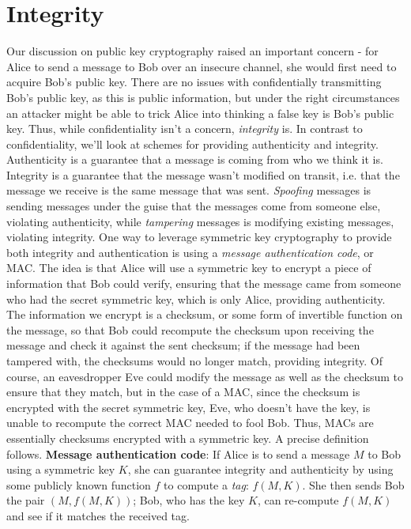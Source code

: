 \documentclass{article}
\begin{document}
\section{Integrity}
Our discussion on public key cryptography raised an important concern - for Alice to send a message to Bob over an insecure channel, she would first need to acquire Bob's public key. There are no issues with confidentially transmitting Bob's public key, as this is public information, but under the right circumstances an attacker might be able to trick Alice into thinking a false key is Bob's public key. Thus, while confidentiality isn't a concern, \textit{integrity} is.
\newline
In contrast to confidentiality, we'll look at schemes for providing authenticity and integrity. Authenticity is a guarantee that a message is coming from who we think it is. Integrity is a guarantee that the message wasn't modified on transit, i.e. that the message we receive is the same message that was sent. \textit{Spoofing} messages is sending messages under the guise that the messages come from someone else, violating authenticity, while \textit{tampering} messages is modifying existing messages, violating integrity.
\newline
One way to leverage symmetric key cryptography to provide both integrity and authentication is using a \textit{message authentication code}, or MAC. The idea is that Alice will use a symmetric key to encrypt a piece of information that Bob could verify, ensuring that the message came from someone who had the secret symmetric key, which is only Alice, providing authenticity. The information we encrypt is a checksum, or some form of invertible function on the message, so that Bob could recompute the checksum upon receiving the message and check it against the sent checksum; if the message had been tampered with, the checksums would no longer match, providing integrity. Of course, an eavesdropper Eve could modify the message as well as the checksum to ensure that they match, but in the case of a MAC, since the checksum is encrypted with the secret symmetric key, Eve, who doesn't have the key, is unable to recompute the correct MAC needed to fool Bob. Thus, MACs are essentially checksums encrypted with a symmetric key. A precise definition follows.
\newline \newline
\textbf{Message authentication code}: If Alice is to send a message $ M $ to Bob using a symmetric key $ K $, she can guarantee integrity and authenticity by using some publicly known function $ f $ to compute a \textit{tag}: $ f(M, K) $. She then sends Bob the pair $ (M, f(M, K)) $; Bob, who has the key $ K $, can re-compute $ f(M, K) $ and see if it matches the received tag.
\end{document}
